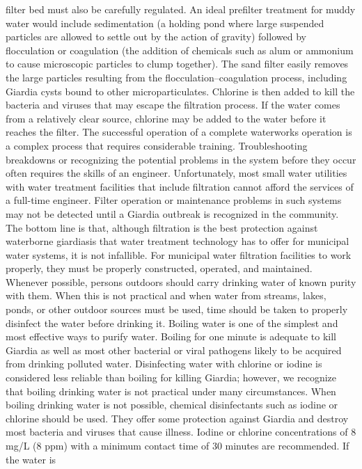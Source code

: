 \documentclass{article}
\begin{document}
filter bed must also be carefully regulated. An ideal prefilter
treatment for muddy water would include sedimentation (a holding pond
where large suspended particles are allowed to settle out by the action
of gravity) followed by flocculation or coagulation (the addition of
chemicals such as alum or ammonium to cause microscopic particles to
clump together). The sand filter easily removes the large particles
resulting from the flocculation--coagulation process, including Giardia
cysts bound to other microparticulates. Chlorine is then added to kill
the bacteria and viruses that may escape the filtration process. If the
water comes from a relatively clear source, chlorine may be added to the
water before it reaches the filter. The successful operation of a
complete waterworks operation is a complex process that requires
considerable training. Troubleshooting breakdowns or recognizing the
potential problems in the system before they occur often requires the
skills of an engineer. Unfortunately, most small water utilities with
water treatment facilities that include filtration cannot afford the
services of a full-time engineer. Filter operation or maintenance
problems in such systems may not be detected until a Giardia outbreak is
recognized in the community. The bottom line is that, although
filtration is the best protection against waterborne giardiasis that
water treatment technology has to offer for municipal water systems, it
is not infallible. For municipal water filtration facilities to work
properly, they must be properly constructed, operated, and maintained.
Whenever possible, persons outdoors should carry drinking water of known
purity with them. When this is not practical and when water from
streams, lakes, ponds, or other outdoor sources must be used, time
should be taken to properly disinfect the water before drinking it.
Boiling water is one of the simplest and most effective ways to purify
water. Boiling for one minute is adequate to kill Giardia as well as
most other bacterial or viral pathogens likely to be acquired from
drinking polluted water. Disinfecting water with chlorine or iodine is
considered less reliable than boiling for killing Giardia; however, we
recognize that boiling drinking water is not practical under many
circumstances. When boiling drinking water is not possible, chemical
disinfectants such as iodine or chlorine should be used. They offer some
protection against Giardia and destroy most bacteria and viruses that
cause illness. Iodine or chlorine concentrations of 8 mg/L (8 ppm) with
a minimum contact time of 30 minutes are recommended. If the water is
\end{document}
